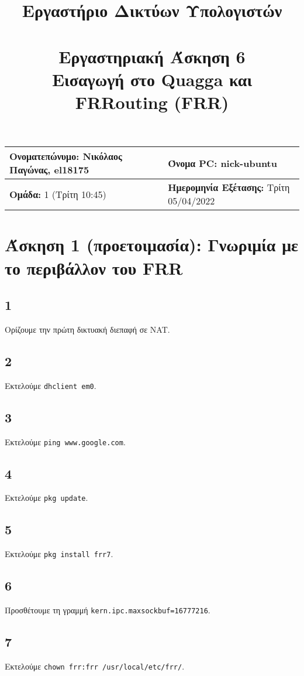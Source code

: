 \documentclass[a4paper, 12pt]{article}
\title{
	\textbf{Εργαστήριο Δικτύων Υπολογιστών} \\~\\
	Εργαστηριακή Άσκηση 6 \\ 
	Εισαγωγή στο Quagga και FRRouting (FRR)
}
\author{}
\date{}
\begin{document}
\maketitle
\begin{center}
	\begin{tabular}{|l|l|}
		\hline
		\textbf{Ονοματεπώνυμο:} Νικόλαος Παγώνας, el18175  & \textbf{Όνομα PC:} nick-ubuntu \\
		\hline
		\textbf{Ομάδα:} 1 (Τρίτη 10:45) & \textbf{Ημερομηνία Εξέτασης:} Τρίτη 05/04/2022 \\
		\hline
	\end{tabular}
\end{center}

\section*{Άσκηση 1 (προετοιμασία): Γνωριμία με το περιβάλλον του FRR}

	\subsection*{1}
		Ορίζουμε την πρώτη δικτυακή διεπαφή σε NAT.
	
	\subsection*{2}
		Εκτελούμε \verb|dhclient em0|.
	
	\subsection*{3}
		Εκτελούμε \verb|ping www.google.com|.
		
	\subsection*{4}
		Εκτελούμε \verb|pkg update|.
	
	\subsection*{5}
		Εκτελούμε \verb|pkg install frr7|.
	
	\subsection*{6}
		Προσθέτουμε τη γραμμή \verb|kern.ipc.maxsockbuf=16777216|. 
	
	\subsection*{7}
		Εκτελούμε \verb|chown frr:frr /usr/local/etc/frr/|.
	
\end{document}
